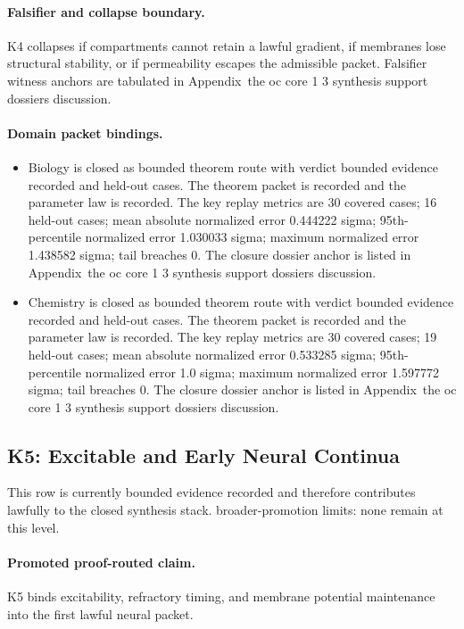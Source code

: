 \paragraph{Falsifier and collapse boundary.}
K4 collapses if compartments cannot retain a lawful gradient, if membranes lose structural stability, or if permeability escapes the admissible packet.
Falsifier witness anchors are tabulated in Appendix~the oc core 1 3 synthesis support dossiers discussion.

\paragraph{Domain packet bindings.}
\begin{itemize}[leftmargin=1.6em,nosep]
\item Biology is closed as bounded theorem route with verdict bounded evidence recorded and  held-out cases. The theorem packet is recorded and the parameter law is recorded. The key replay metrics are 30 covered cases; 16 held-out cases; mean absolute normalized error 0.444222 sigma; 95th-percentile normalized error 1.030033 sigma; maximum normalized error 1.438582 sigma; tail breaches 0. The closure dossier anchor is listed in Appendix~the oc core 1 3 synthesis support dossiers discussion.
\item Chemistry is closed as bounded theorem route with verdict bounded evidence recorded and  held-out cases. The theorem packet is recorded and the parameter law is recorded. The key replay metrics are 30 covered cases; 19 held-out cases; mean absolute normalized error 0.533285 sigma; 95th-percentile normalized error 1.0 sigma; maximum normalized error 1.597772 sigma; tail breaches 0. The closure dossier anchor is listed in Appendix~the oc core 1 3 synthesis support dossiers discussion.
\end{itemize}

\subsection{K5: Excitable and Early Neural Continua}
\label{sec:oc-core-1-3-synthesis-k5}
This row is currently bounded evidence recorded and therefore contributes lawfully to the closed synthesis stack.
broader-promotion limits: none remain at this level.

\paragraph{Promoted proof-routed claim.}
K5 binds excitability, refractory timing, and membrane potential maintenance into the first lawful neural packet.

